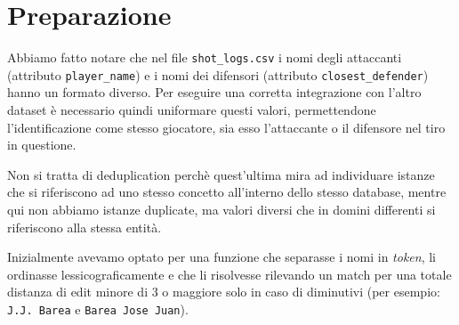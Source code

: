 \section{Preparazione}

Abbiamo fatto notare che nel file \texttt{shot\_logs.csv} i nomi degli attaccanti (attributo \texttt{player\_name}) e i nomi dei difensori (attributo \texttt{closest\_defender}) hanno un formato diverso. Per eseguire una corretta integrazione con l’altro dataset è necessario quindi uniformare questi valori, permettendone l’identificazione come stesso giocatore, sia esso l’attaccante o il difensore nel tiro in questione. 
\par
Non si tratta di deduplication perchè quest’ultima mira ad individuare istanze che si riferiscono ad uno stesso concetto all’interno dello stesso database, mentre qui non abbiamo istanze duplicate, ma valori diversi che in domini differenti si riferiscono alla stessa entità.
\par
Inizialmente avevamo optato per una funzione che separasse i nomi in \textit{token}, li ordinasse lessicograficamente e che li risolvesse rilevando un match per una totale distanza di edit minore di 3 o maggiore solo in caso di diminutivi (per esempio: \texttt{J.J. Barea} e \texttt{Barea Jose Juan}).

